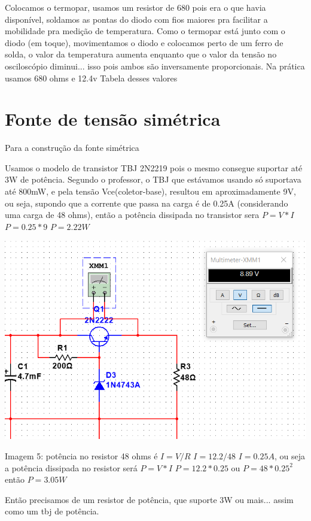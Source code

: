 \documentclass{article}
\begin{document}
Colocamos o termopar, usamos um resistor de 680 pois era o que havia disponível, soldamos as pontas do diodo com fios maiores pra facilitar a mobilidade pra medição de temperatura. Como o termopar está junto com o diodo (em toque), movimentamos o diodo e colocamos perto de um ferro de solda, o valor da temperatura aumenta enquanto que o valor da tensão no osciloscópio diminui... isso pois ambos são inversamente proporcionais.
Na prática usamos 680 ohms e 12.4v
Tabela desses valores


\section{Fonte de tensão simétrica}
Para a construção da fonte simétrica

Usamos o modelo de transistor TBJ 2N2219 pois o mesmo consegue suportar até 3W de potência. Segundo o professor, o TBJ que estávamos usando só suportava até 800mW, e pela tensão Vce(coletor-base), resultou em aproximadamente 9V, ou seja, supondo que a corrente que passa na carga é de 0.25A (considerando uma carga de 48 ohms), então a potência dissipada no transistor sera $P=V*I$ $P=0.25*9$ $P=2.22W$

\begin{center}
    \includegraphics[scale=0.5]{images/potenciatrans.png}
    
    Imagem 5: potência no resistor 48 ohms é $I=V/R$ $I=12.2/48$ $I=0.25A$, ou seja a potência dissipada no resistor será $P=V*I$ $P=12.2*0.25$ ou $P=48*0.25^2$ então $P=3.05W$
\end{center}

Então precisamos de um resistor de potência, que suporte 3W ou mais... assim como um tbj de potência.
\end{document}

